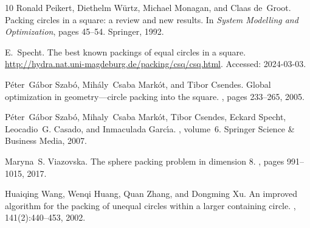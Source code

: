 \documentclass[10pt,a4paper]{article}
\theoremstyle{plain}
\theoremstyle{plain}
\theoremstyle{plain}
\theoremstyle{definition}
\begin{document}
{\begin{thebibliography}{10}
Ronald Peikert, Diethelm W{\"u}rtz, Michael Monagan, and Claas de~Groot.
\newblock Packing circles in a square: a review and new results.
\newblock In {\em System Modelling and Optimization}, pages 45--54. Springer, 1992.

E.~Specht.
\newblock The best known packings of equal circles in a square.
\newblock \url{http://hydra.nat.uni-magdeburg.de/packing/csq/csq.html}.
\newblock Accessed: 2024-03-03.

P{\'e}ter~G{\'a}bor Szab{\'o}, Mih{\'a}ly~Csaba Mark{\'o}t, and Tibor Csendes.
\newblock Global optimization in geometry—circle packing into the square.
, pages 233--265, 2005.

P{\'e}ter~G{\'a}bor Szab{\'o}, Mihaly~Csaba Mark{\'o}t, Tibor Csendes, Eckard Specht, Leocadio~G. Casado, and Inmaculada Garc{\'\i}a.
, volume~6.
\newblock Springer Science \& Business Media, 2007.

Maryna~S. Viazovska.
\newblock The sphere packing problem in dimension 8.
, pages 991--1015, 2017.

Huaiqing Wang, Wenqi Huang, Quan Zhang, and Dongming Xu.
\newblock An improved algorithm for the packing of unequal circles within a larger containing circle.
, 141(2):440--453, 2002.

\end{thebibliography}

\appendix



}
\end{document}
